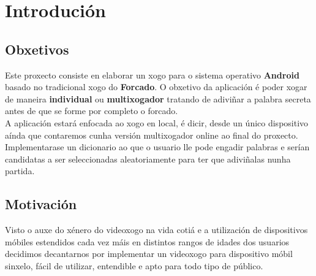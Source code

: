 \chapter{Introdución}
\label{chap:introducion}
\section{Obxetivos}
Este proxecto consiste en elaborar un xogo para o sistema operativo \textbf{Android} basado no tradicional xogo do \textbf{Forcado}. O obxetivo da aplicación é poder xogar de maneira \textbf{individual} ou \textbf{multixogador} tratando de adiviñar a palabra secreta antes de que se forme por completo o forcado.\\

A aplicación estará enfocada ao xogo en local, é dicir, desde un único dispositivo aínda que contaremos cunha versión multixogador online ao final do proxecto. Implementarase un dicionario ao que o usuario lle pode engadir palabras e serían candidatas a ser seleccionadas aleatoriamente para ter que adiviñalas nunha partida.

\section{Motivación}
Visto o auxe do xénero do videoxogo na vida cotiá e a utilización de dispositivos móbiles estendidos cada vez máis en distintos rangos de idades dos usuarios decidimos decantarnos por implementar un videoxogo para dispositivo móbil sinxelo, fácil de utilizar, entendible e apto para todo tipo de público.


